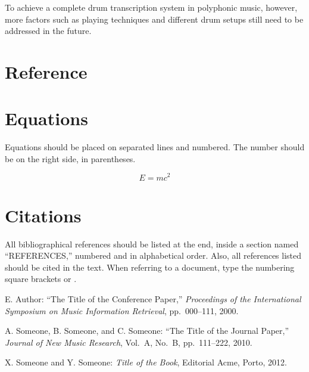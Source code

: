 \documentclass{article}
\begin{document}
To achieve a complete drum transcription system in polyphonic music, however, more factors such as playing techniques and different drum setups still need to be addressed in the future. 

\section{Reference}





\section{Equations}

Equations should be placed on separated lines and numbered.
The number should be on the right side, in parentheses.

\begin{equation}
E=mc^{2}
\end{equation}

\section{Citations}

All bibliographical references should be listed at the end,
inside a section named ``REFERENCES,'' numbered and in alphabetical order.
Also, all references listed should be cited in the text.
When referring to a document, type the numbering square brackets
\cite{Author:00} or \cite{Author:00,Someone:10,Someone:04}.

\begin{thebibliography}{citations}

E. Author:
``The Title of the Conference Paper,''
{\it Proceedings of the International Symposium
on Music Information Retrieval}, pp.~000--111, 2000.

A. Someone, B. Someone, and C. Someone:
``The Title of the Journal Paper,''
{\it Journal of New Music Research},
Vol.~A, No.~B, pp.~111--222, 2010.

 X. Someone and Y. Someone: {\it Title of the Book},
    Editorial Acme, Porto, 2012.

\end{thebibliography}

%
\end{document}
